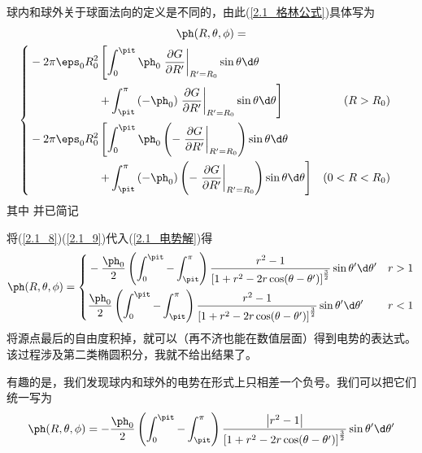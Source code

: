     球内和球外关于球面法向的定义是不同的，由此(\ref{2.1_格林公式})具体写为
    \begin{multline}
        \ph(R,\theta,\phi)=\\
        \left\{
        \begin{aligned}
        	&-2\pi\eps_0 R_0^2
        	\left[  
        	    \int_0^{\pit}\ph_0\left.\frac{\partial G}{\partial R'}\right|_{R'=R_0}\sin\theta\d\theta\right. & \\
        	    &\left.\qquad\qquad\qquad + \int_\pit^{\pi}\left(-\ph_0\right)\left.\frac{\partial G}{\partial R'}\right|_{R'=R_0}\sin\theta\d\theta
        	\right] 
        	&\left(R>R_0\right)& \\
        	&-2\pi\eps_0 R_0^2
        	\left[  
        	    \int_0^{\pit}\ph_0\left(-\left.\frac{\partial G}{\partial R'}\right|_{R'=R_0}\right)\sin\theta\d\theta\right. & \\
        	    &\left.\qquad\qquad\qquad + \int_\pit^{\pi}\left(-\ph_0\right)\left(-\left.\frac{\partial G}{\partial R'}\right|_{R'=R_0}\right)\sin\theta\d\theta
        	\right] 
        	&\left(0<R<R_0\right)& 
    	\end{aligned}
        \right.\label{2.1_电势解}
    \end{multline}
    其中
    并已简记
    \label{2.1_9}
    
    将(\ref{2.1_8})(\ref{2.1_9})代入(\ref{2.1_电势解})得
    \begin{equation}
        \ph(R,\theta,\phi)=
        \left\{
        \begin{aligned}
        	&-\frac{\ph_0}{2}
        	\left(\int_0^{\pit}-\int_{\pit}^{\pi}\right)
        	\frac{r^2-1}{\left[1+r^2-2r\cos(\theta-\theta')\right]^{\frac{3}{2}}}\sin\theta'\d\theta'
        	&r>1 \\
        	&\frac{\ph_0}{2}
        	\left(\int_0^{\pit}-\int_{\pit}^{\pi}\right)
        	\frac{r^2-1}{\left[1+r^2-2r\cos(\theta-\theta')\right]^{\frac{3}{2}}}\sin\theta'\d\theta'
        	&r<1
    	\end{aligned}
        \right.
    \end{equation}
    将源点最后的自由度积掉，就可以（再不济也能在数值层面）得到电势的表达式。该过程涉及第二类椭圆积分，我就不给出结果了。
    
    有趣的是，我们发现球内和球外的电势在形式上只相差一个负号。我们可以把它们统一写为
    \begin{equation}
        \ph(R,\theta,\phi)=
    	-\frac{\ph_0}{2}
    	\left(\int_0^{\pit}-\int_{\pit}^{\pi}\right)
    	\frac{\left|r^2-1\right|}{\left[1+r^2-2r\cos(\theta-\theta')\right]^{\frac{3}{2}}}\sin\theta'\d\theta'
    \end{equation}
